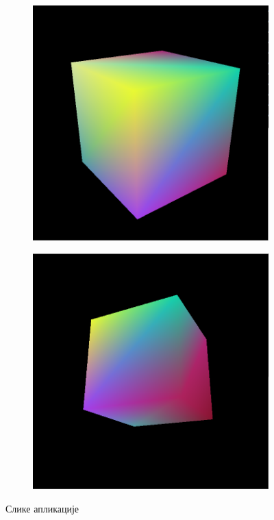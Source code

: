 \documentclass[12pt]{article}
\begin{document}
	\begin{figure}[H]
		\centering
		\begin{subfigure}{0.45\linewidth}
			\includegraphics[width=\linewidth]{slike/aplikacijaSlika1.PNG}
		\end{subfigure}
		\begin{subfigure}{0.45\linewidth}
			\includegraphics[width=\linewidth]{slike/aplikacijaSlika2.PNG}
		\end{subfigure}
		\caption{Слике апликације}
		\label{fig:katmulklark}
	\end{figure}
	
\end{document}

